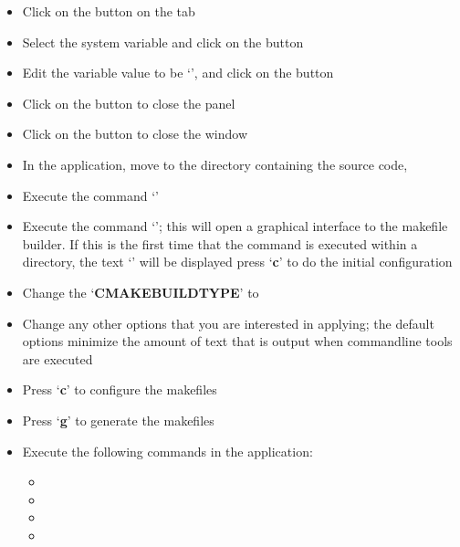 \begin{itemize}
\item\exSp{}Click on the  button on the 
tab
\item\exSp{}Select the  system variable and click on the
 button 
\item\exSp{}Edit the variable value to be
`', and
click on the  button
\item\exSp{}Click on the  button to close the 
panel
\item\exSp{}Click on the  button to close the 
window
\end{itemize}
\tertiaryEnd
{}
\begin{itemize}
\item In the  application, move to the directory containing the \mplusm{}
source code, 
\item\exSp{}Execute the command `'
\item\exSp{}Execute the command `'; this will open a graphical interface
to the makefile builder. If this is the first time that the command is executed within a
directory, the text `' will be displayed \longDash{} press
`\textbf{c}' to do the initial configuration
\item\exSp{}Change the `\textbf{CMAKE\fUS{}BUILD\fUS{}TYPE}' to 
\item\exSp{}Change any other options that you are interested in applying; the default
options minimize the amount of text that is output when \mplusm{} command\longDash{}line
tools are executed
\item\exSp{}Press `\textbf{c}' to configure the makefiles
\item\exSp{}Press `\textbf{g}' to generate the makefiles
\item\exSp{}Execute the following commands in the  application:
\begin{itemize}
\item\exSp{}
\item\exSp{}
\item\exSp{}
\item\exSp{}
\end{itemize}

\end{itemize}
